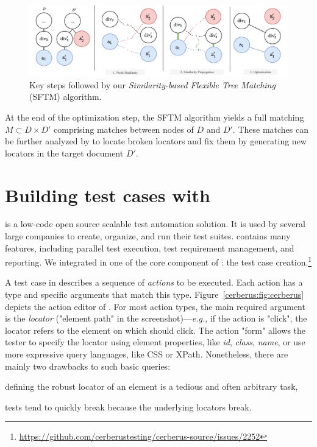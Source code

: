 \begin{figure}[!t]
    \centering
    \includegraphics[width=0.8\linewidth]{cerberus/explanations/sftm}
    \caption{Key steps followed by our \emph{Similarity-based Flexible Tree Matching} (SFTM) algorithm.}
    \label{cerberus:fig:steps_sftm}
\end{figure}

At the end of the optimization step, the SFTM algorithm yields a full matching $M \subset D \times D' $ comprising matches between nodes of $D$ and $D'$.
These matches can be further analyzed by \erratum{} to locate broken locators and fix them by generating new locators in the target document $D'$.

\section{Building test cases with \cerberus}\label{cerberus:sec:cerberus}
\cerberus is a low-code open source scalable test automation solution.
It is used by several large companies to create, organize, and run their test suites.
\cerberus contains many features, including parallel test execution, test requirement management, and reporting.
We integrated \erratum in one of the core component of \cerberus: the test case creation.\footnote{\url{https://github.com/cerberustesting/cerberus-source/issues/2252}}

A test case in \cerberus describes a sequence of \textit{actions} to be executed.
Each action has a type and specific arguments that match this type.
Figure~\ref{cerberus:fig:cerberus} depicts the action editor of \cerberus.
For most action types, the main required argument is the \textit{locator} ("element path" in the screenshot)---\emph{e.g.}, if the action is "click", the locator refers to the element on which \cerberus should click.
The action "form" allows the tester to specify the locator using element properties, like \textit{id}, \textit{class}, \textit{name}, or use more expressive query languages, like CSS or XPath.
Nonetheless, there are mainly two drawbacks to such basic queries:
\begin{compactitem}
    \item defining the robust locator of an element is a tedious and often arbitrary task,
    \item tests tend to quickly break because the underlying locators break.
\end{compactitem}

